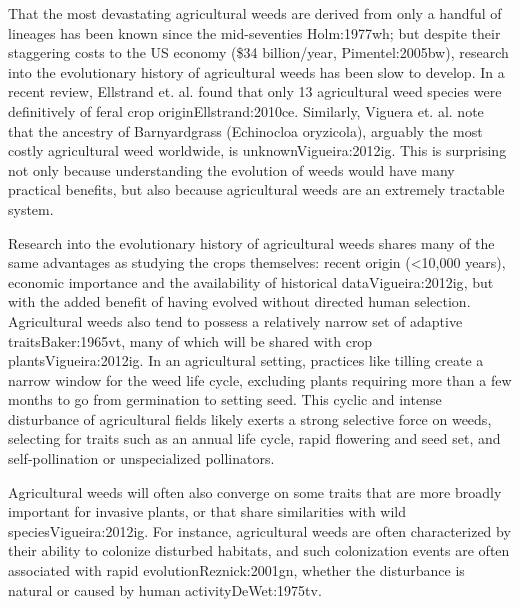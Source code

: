 \documentclass[twocolumn]{bmcart}%
\begin{document}
That the most devastating agricultural weeds are derived from only a handful of lineages has been known since the mid-seventies {Holm:1977wh}; but despite their staggering costs to the US economy (\$34 billion/year, {Pimentel:2005bw}), research into the evolutionary history of agricultural weeds has been slow to develop. In a recent review, Ellstrand et. al. found that only 13 agricultural weed species were definitively of feral crop origin{Ellstrand:2010ce}. Similarly, Viguera et. al. note that the ancestry of Barnyardgrass (Echinocloa oryzicola), arguably the most costly agricultural weed worldwide, is unknown{Vigueira:2012ig}. This is surprising not only because understanding the evolution of weeds would have many practical benefits, but also because agricultural weeds are an extremely tractable system. 

Research into the evolutionary history of agricultural weeds shares many of the same advantages as studying the crops themselves: recent origin (<10,000 years), economic importance and the availability of historical data{Vigueira:2012ig}, but with the added benefit of having evolved without directed human selection. Agricultural weeds also tend to possess a relatively narrow set of adaptive traits{Baker:1965vt}, many of which will be shared with crop plants{Vigueira:2012ig}. In an agricultural setting, practices like tilling create a narrow window for the weed life cycle, excluding plants requiring more than a few months to go from germination to setting seed. This cyclic and intense disturbance of agricultural fields likely exerts a strong selective force on weeds, selecting for traits such as an annual life cycle, rapid flowering and seed set, and self-pollination or unspecialized pollinators.
%
%
%
%
%
%

Agricultural weeds will often also converge on some traits that are more broadly important for invasive plants, or that share similarities with wild species{Vigueira:2012ig}. For instance, agricultural weeds are often characterized by their ability to colonize disturbed habitats, and such colonization events are often associated with rapid evolution{Reznick:2001gn}, whether the disturbance is natural or caused by human activity{DeWet:1975tv}. 
\end{document}

